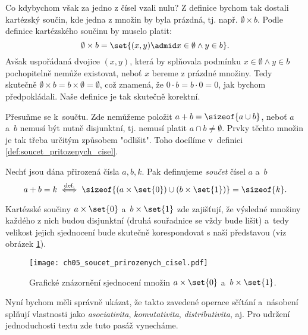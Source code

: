 Co kdybychom však za jedno z čísel vzali nulu? Z definice bychom tak dostali kartézský součin, kde jedna z množin by byla prázdná, tj. např. $\emptyset\times b$. Podle definice kartézského součinu by muselo platit:
\begin{equation*}
    \emptyset\times b=\set{(x,y) \admid x\in\emptyset \land y\in b}.
\end{equation*}
Avšak uspořádaná dvojice $(x,y)$, která by splňovala podmínku $x\in\emptyset \land y\in b$ pochopitelně nemůže existovat, neboť $x$ bereme z prázdné množiny. Tedy skutečně $\emptyset\times b=b\times\emptyset=\emptyset$, což znamená, že $0\cdot b=b\cdot 0=0$, jak bychom předpokládali. Naše definice je tak skutečně korektní.\par
Přesuňme se k~součtu. Zde nemůžeme položit $a+b=\sizeof{a\cup b}$, neboť $a$ a~$b$ nemusí být nutně disjunktní, tj. nemusí platit $a\cap b\neq\emptyset$. Prvky těchto množin je tak třeba určitým způsobem "odlišit". Toho docílíme v~definici \ref{def:soucet_pritozenych_cisel}.
\begin{definition}\label{def:soucet_pritozenych_cisel}
    Nechť jsou dána přirozená čísla $a,b,k$. Pak definujeme \emph{součet} čísel $a$ a~$b$
    \begin{equation*}
        a+b=k\stackrel{\text{def.}}{\iff} \sizeof{(a\times\set{0})\cup (b\times\set{1})}=\sizeof{k}.
    \end{equation*}
\end{definition}
Kartézské součiny $a\times\set{0}$ a~$b\times\set{1}$ zde zajišťují, že výsledné množiny každého z nich budou disjunktní (druhá souřadnice se vždy bude lišit) a~tedy velikost jejich sjednocení bude skutečně korespondovat s naší představou (viz obrázek \ref{fig:soucet_prirozenych_cisel}).
\begin{figure}[H]
	\centering
	\texttt{[image: ch05\_soucet\_prirozenych\_cisel.pdf]}
    \caption{Grafické znázornění sjednocení množin $a\times\set{0}$ a~$b\times\set{1}$.}
    \label{fig:soucet_prirozenych_cisel}
\end{figure}
Nyní bychom měli správně ukázat, že takto zavedené operace sčítání a~násobení splňují vlastnosti jako \emph{asociativita}, \emph{komutativita}, \emph{distributivita}, aj. Pro udržení jednoduchosti textu zde tuto pasáž vynecháme.